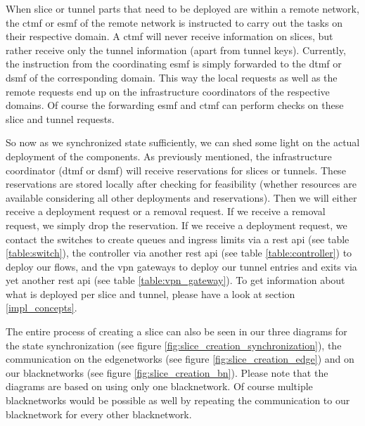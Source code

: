 When slice or tunnel parts that need to be deployed are within a remote network, the \acrshort{ctmf} or \acrshort{esmf} of the remote network is instructed to carry out the tasks on their respective domain. A \acrshort{ctmf} will never receive information on slices, but rather receive only the tunnel information (apart from tunnel keys). Currently, the instruction from the coordinating \acrshort{esmf} is simply forwarded to the \acrshort{dtmf} or \acrshort{dsmf} of the corresponding domain. This way the local requests as well as the remote requests end up on the infrastructure coordinators of the respective domains. Of course the forwarding \acrshort{esmf} and \acrshort{ctmf} can perform checks on these slice and tunnel requests.

So now as we synchronized state sufficiently, we can shed some light on the actual deployment of the components. As previously mentioned, the infrastructure coordinator (\acrshort{dtmf} or \acrshort{dsmf}) will receive reservations for slices or tunnels. These reservations are stored locally after checking for feasibility (whether resources are available considering all other deployments and reservations). Then we will either receive a deployment request or a removal request. If we receive a removal request, we simply drop the reservation. If we receive a deployment request, we contact the switches to create queues and ingress limits via a \acrshort{rest} \acrshort{api} (see table \ref{table:switch}), the controller via another \acrshort{rest} \acrshort{api} (see table \ref{table:controller}) to deploy our flows, and the \acrshort{vpn} gateways to deploy our tunnel entries and exits via yet another \acrshort{rest} \acrshort{api} (see table \ref{table:vpn_gateway}). To get information about what is deployed per slice and tunnel, please have a look at section \ref{impl_concepts}.

The entire process of creating a slice can also be seen in our three diagrams for the state synchronization (see figure \ref{fig:slice_creation_synchronization}), the communication on the \gls{edgenetwork}s (see figure \ref{fig:slice_creation_edge}) and on our \gls{blacknetwork}s (see figure \ref{fig:slice_creation_bn}). Please note that the diagrams are based on using only one \gls{blacknetwork}. Of course multiple \gls{blacknetwork}s would be possible as well by repeating the communication to our \gls{blacknetwork} for every other \gls{blacknetwork}.

\newpage

